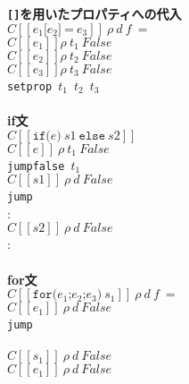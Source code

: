 \documentclass[a4j,12pt]{jarticle}
\begin{document}
{\begin{tabbing}
\textbf{\texttt{[]}を用いたプロパティへの代入} \\
\>$C[[e_1\texttt{[}e_2\texttt{]}\ \texttt{=}\ e_3]]\ \rho\ d\ f\ =$ \\
\>\>$C[[e_1]] \rho\ t_1\ False$ \\
\>\>$C[[e_2]] \rho\ t_2\ False$ \\
\>\>$C[[e_3]] \rho\ t_3\ False$ \\
\>\>\texttt{setprop}\ $t_1$\ $t_2$\ $t_3$ \\
\\

\textbf{if文} \\
\>$C[[\texttt{if(}e\texttt{)}\ s1\ \texttt{else}\ s2]]$ \\
\>\>$C[[e]]\ \rho\ t_1\ False$ \\
\>\>\texttt{jumpfalse}\ $t_1$\  \\
\>\>$C[[s1]]\ \rho\ d\ False$ \\
\>\>\texttt{jump}\  \\
\>\>: \\
\>\>$C[[s2]]\ \rho\ d\ False$ \\
\>\>: \\
\\

\textbf{for文} \\
\>$C[[\texttt{for(}e_1\texttt{;}e_2\texttt{;}e_3\texttt{)}\ s_1]]\ \rho\ d\ f\ =$\\
\>\>$C[[e_1]]\ \rho\ d\ False$ \\
\>\>\texttt{jump}\  \\
\>\> \\
\>\>$C[[s_1]]\ \rho\ d\ False$ \\
\>\>$C[[e_1]]\ \rho\ d\ False$ \\
\>\> 
\>
\\


\end{tabbing}}
\end{document}
